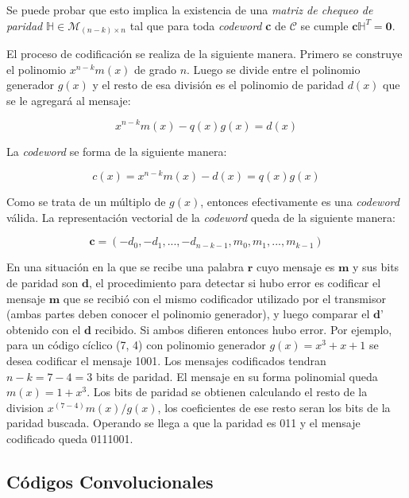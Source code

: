 Se puede probar que esto implica la existencia de una \textit{matriz de chequeo de paridad} $\mathbb{H} \in \mathcal{M}_{(n-k)\times n}$ tal que para toda \textit{codeword} \textbf{c} de $\mathcal{C}$ se cumple $\textbf{c} \mathbb{H} ^T = \textbf{0}$.


El proceso de codificación se realiza de la siguiente manera. Primero se construye el polinomio $x^{n-k}m(x)$ de grado $n$. Luego se divide entre el polinomio generador $g(x)$ y el resto de esa división es el polinomio de paridad $d(x)$ que se le agregará al mensaje:

\begin{equation}
x^{n-k}m(x) - q(x)g(x) = d(x)
\end{equation}

La \textit{codeword} se forma de la siguiente manera:

\begin{equation}
c(x) = x^{n-k}m(x)-d(x) = q(x)g(x)
\end{equation}

Como se trata de un múltiplo de $g(x)$, entonces efectivamente es una \textit{codeword} válida. La representación vectorial de la \textit{codeword} queda de la siguiente manera:

\begin{equation}
\textbf{c} = (-d_0, -d_1, ..., -d_{n-k-1}, m_0, m_1, ..., m_{k-1})
\end{equation}

En una situación en la que se recibe una palabra $\textbf{r}$ cuyo mensaje es $\textbf{m}$  y sus bits de paridad son $\textbf{d}$, el procedimiento para detectar si hubo error es codificar el mensaje $\textbf{m}$ que se recibió con el mismo codificador utilizado por el transmisor (ambas partes deben conocer el polinomio generador), y luego comparar el $\textbf{d'}$ obtenido con el $\textbf{d}$ recibido. Si ambos difieren entonces hubo error. 
Por ejemplo, para un código cíclico (7, 4) con polinomio generador $g(x) = x^3 + x + 1$ se desea codificar el mensaje 1001. Los mensajes codificados tendran $n-k = 7 - 4 = 3$ bits de paridad. El mensaje en su forma polinomial queda $m(x) = 1 + x^3$.
Los bits de paridad se obtienen calculando el resto de la division $x^{(7-4)}m(x)/g(x)$, los coeficientes de ese resto seran los bits de la paridad buscada. Operando se llega a que la paridad es 011 y el mensaje codificado queda 0111001.

\subsection{Códigos Convolucionales}

